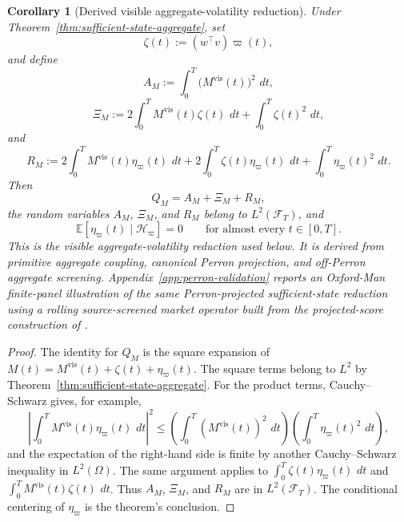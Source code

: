 \documentclass[11pt,a4paper]{amsart}
\theoremstyle{plain}
\newtheorem{corollary}[theorem]{Corollary}
\theoremstyle{definition}
\theoremstyle{remark}
\newcommand{\EE}{\mathbb{E}}
\newcommand{\dd}{\,d}
\newcommand{\cH}{\mathcal{H}}
\newcommand{\cF}{\mathcal{F}}
\begin{document}
\begin{corollary}[Derived visible aggregate-volatility reduction]\label{cor:visible-aggregate}
Under Theorem~\ref{thm:sufficient-state-aggregate}, set
\[
        \zeta(t):=(w^\top v)\varpi(t),
\]
and define
\[
        A_M:=\int_0^T \bigl(M^{\mathrm{vis}}(t)\bigr)^2\,\dd t,
\]
\[
        \Xi_M
        :=
        2\int_0^T M^{\mathrm{vis}}(t)\zeta(t)\,\dd t
        +
        \int_0^T \zeta(t)^2\,\dd t,
\]
and
\[
        R_M
        :=
        2\int_0^T M^{\mathrm{vis}}(t)\eta_\varpi(t)\,\dd t
        +
        2\int_0^T \zeta(t)\eta_\varpi(t)\,\dd t
        +
        \int_0^T \eta_\varpi(t)^2\,\dd t.
\]
Then
\[
        Q_M=A_M+\Xi_M+R_M,
\]
the random variables \(A_M\), \(\Xi_M\), and \(R_M\) belong to \(L^2(\cF_T)\), and
\[
        \EE[\eta_\varpi(t)\mid \cH_\varpi]=0
        \qquad
        \text{for almost every } t\in[0,T].
\]
This is the visible aggregate-volatility reduction used below.  It is derived from primitive
aggregate coupling, canonical Perron projection, and off-Perron aggregate screening.
Appendix~\ref{app:perron-validation} reports an Oxford-Man finite-panel illustration of the same
Perron-projected sufficient-state reduction using a rolling source-screened market operator built
from the projected-score construction of \cite{vidal2026econometric}.
\end{corollary}

\begin{proof}
The identity for \(Q_M\) is the square expansion of
\(
        M(t)=M^{\mathrm{vis}}(t)+\zeta(t)+\eta_\varpi(t)
\).
The square terms belong to \(L^2\) by Theorem~\ref{thm:sufficient-state-aggregate}.  For the
product terms, Cauchy--Schwarz gives, for example,
\[
        \left|\int_0^T M^{\mathrm{vis}}(t)\eta_\varpi(t)\,\dd t\right|^2
        \le
        \left(\int_0^T (M^{\mathrm{vis}}(t))^2\,\dd t\right)
        \left(\int_0^T \eta_\varpi(t)^2\,\dd t\right),
\]
and the expectation of the right-hand side is finite by another Cauchy--Schwarz inequality in
\(L^2(\Omega)\).  The same argument applies to \(\int_0^T\zeta(t)\eta_\varpi(t)\,\dd t\) and
\(\int_0^T M^{\mathrm{vis}}(t)\zeta(t)\,\dd t\).  Thus \(A_M\), \(\Xi_M\), and \(R_M\) are in
\(L^2(\cF_T)\).  The conditional centering of \(\eta_\varpi\) is the theorem's conclusion.
\end{proof}
\end{document}
